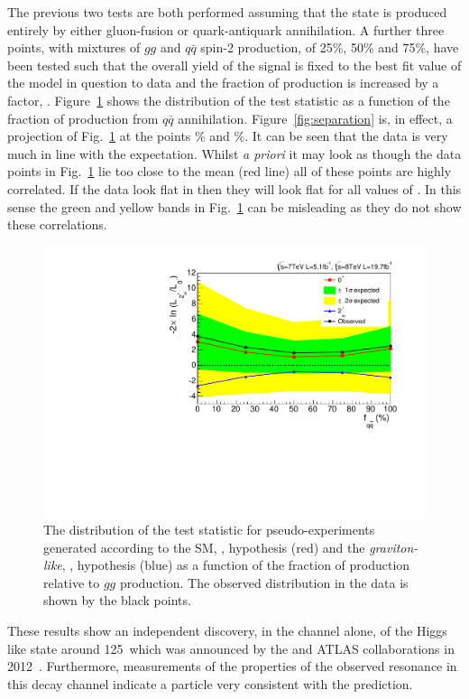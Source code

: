 The previous two tests are both performed assuming that the \twomp state is produced entirely by either gluon-fusion or quark-antiquark annihilation. A further three points, with mixtures of $gg$ and $q\bar{q}$ spin-2 production, of 25\%, 50\% and 75\%, have been tested such that the overall yield of the \twomp signal is fixed to the best fit value of the model in question to data and the fraction of \qqbar production is increased by a factor, \fqqbar. Figure~\ref{fig:qqbar} shows the distribution of the test statistic as a function of the fraction of \twomp production from $q\bar{q}$ annihilation. Figure~\ref{fig:separation} is, in effect, a projection of Fig.~\ref{fig:qqbar} at the points \% and \%. It can be seen that the data is very much in line with the \SM expectation. Whilst \textit{a priori} it may look as though the data points in Fig.~\ref{fig:qqbar} lie too close to the \SM mean (red line) all of these points are highly correlated. If the data look flat in \abscostheta then they will look flat for all values of \fqqbar. In this sense the green and yellow bands in Fig.~\ref{fig:qqbar} can be misleading as they do not show these correlations.

\begin{figure}
  \begin{center}
    \includegraphics[width=0.8\linewidth]{results/plots/fqqbar.pdf}
    \caption[Distribution of the test statistic as a function of \fqqbar for the spin analysis]{The distribution of the test statistic for pseudo-experiments generated according to the SM, \zerop, hypothesis (red) and the \emph{graviton-like}, \twomp, hypothesis (blue) as a function of the fraction of \qqbar production relative to $gg$ production. The observed distribution in the data is shown by the black points.}
    \label{fig:qqbar}
  \end{center}
\end{figure}

These results show an independent discovery, in the \Hgg channel alone, of the Higgs like state around 125~\GeV which was announced by the \CMS and ATLAS collaborations in 2012~\cite{CMSDiscovery,ATLASDiscovery}. Furthermore, measurements of the properties of the observed resonance in this decay channel indicate a particle very consistent with the \SM prediction.



